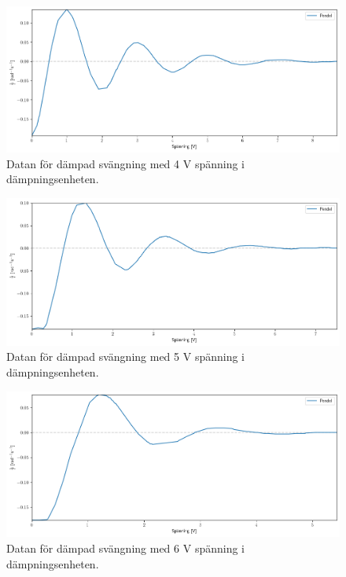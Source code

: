 \documentclass[12pt, a4paper]{article}
\begin{document}
\begin{figure}[hp]
    \includegraphics[width=\textwidth]{graf_4_v_centered}
    \caption{Datan för dämpad svängning med 4 V spänning i dämpningsenheten.}
    \label{fig:data_4_v}
\end{figure}

\begin{figure}[hp]
    \includegraphics[width=\textwidth]{graf_5_v_centered}
    \caption{Datan för dämpad svängning med 5 V spänning i dämpningsenheten.}
    \label{fig:data_5_v}
\end{figure}

\begin{figure}[hp]
    \includegraphics[width=\textwidth]{graf_6_v_centered}
    \caption{Datan för dämpad svängning med 6 V spänning i dämpningsenheten.}
    \label{fig:data_6_v}
\end{figure}
\end{document}
